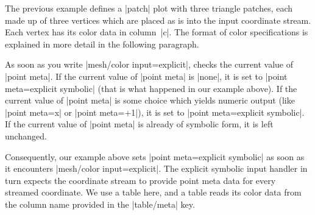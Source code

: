 {{\begin{codeexample}[]
\end{codeexample}
%
\noindent The previous example defines a |patch| plot with three triangle
patches, each made up of three vertices which are placed as is into the input
coordinate stream. Each vertex has its color data in column~|c|. The format of
color specifications is explained in more detail in the following paragraph.

As soon as you write |mesh/color input=explicit|, \PGFPlots{} checks the
current value of |point meta|. If the current value of |point meta| is |none|,
it is set to |point meta=explicit symbolic| (that is what happened in our
example above). If the current value of |point meta| is some choice which
yields numeric output (like |point meta=x| or |point meta=+1|), it
is set to |point meta=explicit symbolic|. If the current value of |point meta|
is already of symbolic form, it is left unchanged.

Consequently, our example above sets |point meta=explicit symbolic| as soon as
it encounters |mesh/color input=explicit|. The explicit symbolic input handler
in turn expects the coordinate stream to provide point meta data for every
streamed coordinate. We use a table here, and a table reads its color data from
the column name provided in the |table/meta| key.

}}
